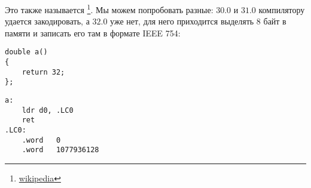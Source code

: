Это также называется \footnote{\href{http://go.yurichev.com/17139}{wikipedia}}.
Мы можем попробовать разные: $30.0$ и $31.0$ компилятору удается закодировать, а $32.0$ уже нет, для него
приходится выделять 8 байт в памяти и записать его там в формате IEEE 754:

\begin{lstlisting}[style=customc]
double a()
{
	return 32;
};
\end{lstlisting}

\begin{lstlisting}[caption=GCC 4.9.1 -O3,style=customasmARM]
a:
	ldr	d0, .LC0
	ret
.LC0:
	.word	0
	.word	1077936128
\end{lstlisting}
